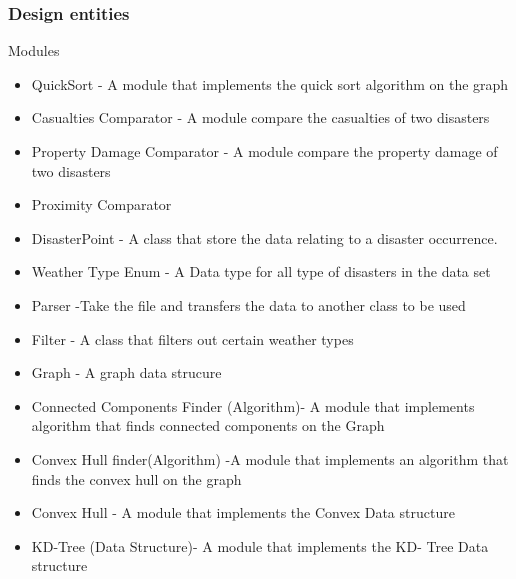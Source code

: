 \documentclass[12pt]{article}
\begin{document}
            \subsubsection{Design entities}
                 Modules 
                \begin{itemize}
                    \item QuickSort - A module that implements the quick sort algorithm on the graph 
                    \item Casualties Comparator - A module compare the casualties of two disasters 
                    \item Property Damage Comparator - A module compare the property damage of two disasters 
                    \item Proximity Comparator 
                    \item DisasterPoint - A class that store the data relating to a disaster occurrence. 
                    \item Weather Type Enum - A Data type for all type of disasters in the data set
                    \item Parser -Take the file and transfers the data to another class to be used 
                    \item Filter - A class that filters out certain weather types 
                    \item Graph - A graph data strucure 
                    \item Connected Components Finder (Algorithm)- A module that implements algorithm that finds connected components on the Graph
                    \item Convex Hull finder(Algorithm) -A module that implements an algorithm that finds the convex hull on the graph
                    \item Convex Hull - A module that implements the Convex Data structure 
                    \item KD-Tree (Data Structure)- A module that implements the KD- Tree Data structure 
                \end{itemize}
                
\end{document}
